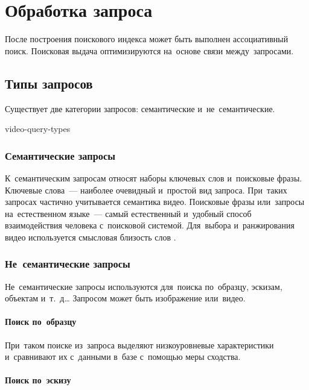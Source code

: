 
\section{Обработка запроса}

После построения поискового индекса может быть выполнен ассоциативный поиск.
Поисковая выдача оптимизируются на~основе связи между~запросами.

\subsection{Типы запросов}


Существует две категории запросов:
семантические и~не~семантические.


\begin{figuredt}
    {video-query-types}
\end{figuredt}


\subsubsection{Семантические запросы}


К~семантическим запросам относят наборы ключевых слов
и~поисковые фразы.
Ключевые слова~— наиболее очевидный и~простой вид запроса.
При~таких запросах частично учитывается семантика видео.
Поисковые фразы или~запросы на~естественном языке~—
самый естественный и~удобный способ взаимодействия
человека с~поисковой системой. Для~выбора и~ранжирования видео
используется смысловая близость слов \cite{Aytar:2008}.

\subsubsection{Не~семантические запросы}

Не~семантические запросы используются для~поиска по~образцу,
эскизам, объектам и~т.~д…
Запросом может быть изображение или~видео.

\paragraph{Поиск по~образцу}

При~таком поиске из~запроса выделяют низкоуровневые характеристики
и~сравнивают их с~данными в~базе с~помощью меры сходства.

\paragraph{Поиск по~эскизу}

